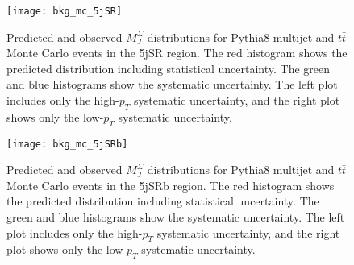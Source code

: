 \begin{figure}[!ht]
    \centering
    \texttt{[image: bkg\_mc\_5jSR]}
    \caption{Predicted and observed $M_{J}^{\Sigma}$ distributions for Pythia8 multijet and $t\bar{t}$ Monte Carlo events in the 5jSR region.
    The red histogram shows the predicted distribution including statistical uncertainty.
    The green and blue histograms show the systematic uncertainty.
    The left plot includes only the high-$p_{T}$ systematic uncertainty, and the right plot shows only the low-$p_{T}$ systematic uncertainty.}
    \label{fig:mc_5jSR}
\end{figure}

\begin{figure}[!ht]
    \centering
    \texttt{[image: bkg\_mc\_5jSRb]}
    \caption{Predicted and observed $M_{J}^{\Sigma}$ distributions for Pythia8 multijet and $t\bar{t}$ Monte Carlo events in the 5jSRb region.
    The red histogram shows the predicted distribution including statistical uncertainty.
    The green and blue histograms show the systematic uncertainty.
    The left plot includes only the high-$p_{T}$ systematic uncertainty, and the right plot shows only the low-$p_{T}$ systematic uncertainty.}
    \label{fig:mc_5jSRb}
\end{figure}
